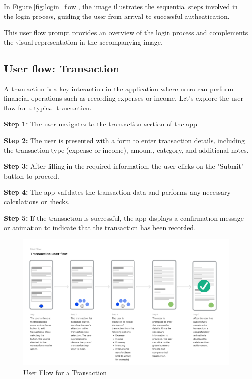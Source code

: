 In Figure \ref{fig:login_flow}, the image illustrates the sequential steps involved in the login process, guiding the user from arrival to successful authentication.

This user flow prompt provides an overview of the login process and complements the visual representation in the accompanying image.


\subsection{User flow: Transaction}

A transaction is a key interaction in the application where users can perform financial operations such as recording expenses or income. Let's explore the user flow for a typical transaction:


  \textbf{Step 1:} The user navigates to the transaction section of the app.
  
   \textbf{Step 2:} The user is presented with a form to enter transaction details, including the transaction type (expense or income), amount, category, and additional notes.
  
  \textbf{Step 3:} After filling in the required information, the user clicks on the "Submit" button to proceed.
  
   \textbf{Step 4:} The app validates the transaction data and performs any necessary calculations or checks.
  
   \textbf{Step 5:} If the transaction is successful, the app displays a confirmation message or animation to indicate that the transaction has been recorded.


\begin{figure}[h!]
  \centering
  \includegraphics[width=\textwidth]{Graphics/UserFlows/TransactionUserFlow.png}
  \caption{User Flow for a Transaction}
  \label{fig:transaction_flow}
\end{figure}

